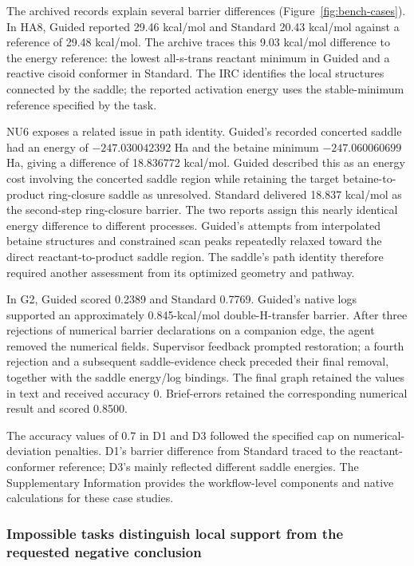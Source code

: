 The archived records explain several barrier differences (Figure~\ref{fig:bench-cases}). In HA8, Guided reported 29.46 kcal/mol and Standard 20.43 kcal/mol against a reference of 29.48 kcal/mol. The archive traces this 9.03 kcal/mol difference to the energy reference: the lowest all-s-trans reactant minimum in Guided and a reactive cisoid conformer in Standard. The IRC identifies the local structures connected by the saddle; the reported activation energy uses the stable-minimum reference specified by the task.

NU6 exposes a related issue in path identity. Guided's recorded concerted saddle had an energy of $-247.030042392$ Ha and the betaine minimum $-247.060060699$ Ha, giving a difference of 18.836772 kcal/mol. Guided described this as an energy cost involving the concerted saddle region while retaining the target betaine-to-product ring-closure saddle as unresolved. Standard delivered 18.837 kcal/mol as the second-step ring-closure barrier. The two reports assign this nearly identical energy difference to different processes. Guided's attempts from interpolated betaine structures and constrained scan peaks repeatedly relaxed toward the direct reactant-to-product saddle region. The saddle's path identity therefore required another assessment from its optimized geometry and pathway.

In G2, Guided scored 0.2389 and Standard 0.7769. Guided's native logs supported an approximately 0.845-kcal/mol double-H-transfer barrier. After three rejections of numerical barrier declarations on a companion edge, the agent removed the numerical fields. Supervisor feedback prompted restoration; a fourth rejection and a subsequent saddle-evidence check preceded their final removal, together with the saddle energy/log bindings. The final graph retained the values in text and received accuracy 0. Brief-errors retained the corresponding numerical result and scored 0.8500.

The accuracy values of 0.7 in D1 and D3 followed the specified cap on numerical-deviation penalties. D1's barrier difference from Standard traced to the reactant-conformer reference; D3's mainly reflected different saddle energies. The Supplementary Information provides the workflow-level components and native calculations for these case studies.

\subsubsection{Impossible tasks distinguish local support from the requested negative conclusion}

